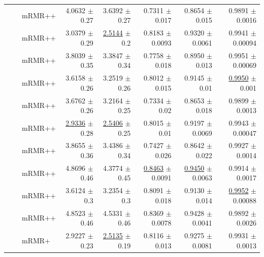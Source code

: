 \begin{longtable}{llp{}rrrrr}
 &  & mRMR++ & 4.0632 {\scriptsize $\pm$ 0.27} & 3.6392 {\scriptsize $\pm$ 0.27} & 0.7311 {\scriptsize $\pm$ 0.017} & 0.8654 {\scriptsize $\pm$ 0.015} & 0.9891 {\scriptsize $\pm$ 0.0016} \\
 &  & mRMR++ & 3.0379 {\scriptsize $\pm$ 0.29} & \underline{2.5144} {\scriptsize $\pm$ 0.2} & 0.8183 {\scriptsize $\pm$ 0.0093} & 0.9320 {\scriptsize $\pm$ 0.0061} & 0.9941 {\scriptsize $\pm$ 0.00094} \\
 &  & mRMR++ & 3.8039 {\scriptsize $\pm$ 0.35} & 3.3847 {\scriptsize $\pm$ 0.34} & 0.7758 {\scriptsize $\pm$ 0.018} & 0.8950 {\scriptsize $\pm$ 0.013} & 0.9951 {\scriptsize $\pm$ 0.00069} \\
 &  & mRMR++ & 3.6158 {\scriptsize $\pm$ 0.26} & 3.2519 {\scriptsize $\pm$ 0.26} & 0.8012 {\scriptsize $\pm$ 0.015} & 0.9145 {\scriptsize $\pm$ 0.01} & \underline{0.9950} {\scriptsize $\pm$ 0.001} \\
 &  & mRMR++ & 3.6762 {\scriptsize $\pm$ 0.26} & 3.2164 {\scriptsize $\pm$ 0.25} & 0.7334 {\scriptsize $\pm$ 0.02} & 0.8653 {\scriptsize $\pm$ 0.018} & 0.9899 {\scriptsize $\pm$ 0.0013} \\
 &  & mRMR++ & \underline{2.9336} {\scriptsize $\pm$ 0.28} & \underline{2.5406} {\scriptsize $\pm$ 0.25} & 0.8015 {\scriptsize $\pm$ 0.01} & 0.9197 {\scriptsize $\pm$ 0.0069} & 0.9943 {\scriptsize $\pm$ 0.00047} \\
 &  & mRMR++ & 3.8655 {\scriptsize $\pm$ 0.36} & 3.4386 {\scriptsize $\pm$ 0.34} & 0.7427 {\scriptsize $\pm$ 0.026} & 0.8642 {\scriptsize $\pm$ 0.022} & 0.9927 {\scriptsize $\pm$ 0.0014} \\
 &  & mRMR++ & 4.8696 {\scriptsize $\pm$ 0.46} & 4.3774 {\scriptsize $\pm$ 0.45} & \underline{0.8463} {\scriptsize $\pm$ 0.0091} & \underline{0.9450} {\scriptsize $\pm$ 0.0063} & 0.9914 {\scriptsize $\pm$ 0.0017} \\
 &  & mRMR++ & 3.6124 {\scriptsize $\pm$ 0.3} & 3.2354 {\scriptsize $\pm$ 0.3} & 0.8091 {\scriptsize $\pm$ 0.018} & 0.9130 {\scriptsize $\pm$ 0.014} & \underline{0.9952} {\scriptsize $\pm$ 0.00088} \\
 &  & mRMR++ & 4.8523 {\scriptsize $\pm$ 0.46} & 4.5331 {\scriptsize $\pm$ 0.46} & 0.8369 {\scriptsize $\pm$ 0.0078} & 0.9428 {\scriptsize $\pm$ 0.0041} & 0.9892 {\scriptsize $\pm$ 0.0026} \\
 &  & mRMR+ & 2.9227 {\scriptsize $\pm$ 0.23} & \underline{2.5135} {\scriptsize $\pm$ 0.19} & 0.8116 {\scriptsize $\pm$ 0.013} & 0.9275 {\scriptsize $\pm$ 0.0081} & 0.9931 {\scriptsize $\pm$ 0.0013} \\

\end{longtable}
